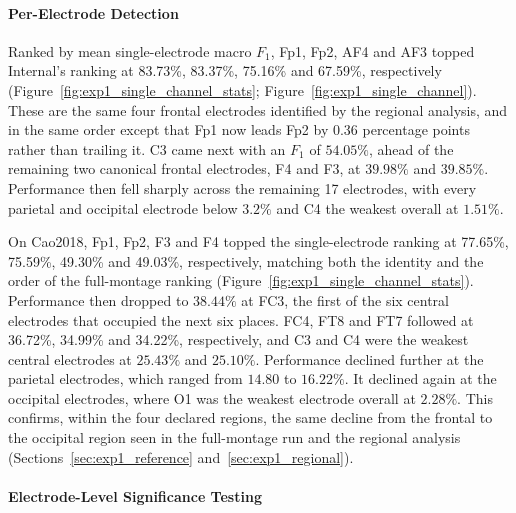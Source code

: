 \documentclass[journal,twoside,web]{ieeecolor}
\begin{document}
\paragraph{Per-Electrode Detection}
\label{sec:exp1_single_channel_per_electrode}

%
Ranked by mean single-electrode macro $F_1$, Fp1, Fp2, AF4 and AF3 topped Internal's ranking at 83.73\%, 83.37\%, 75.16\% and 67.59\%, respectively (Figure~\ref{fig:exp1_single_channel_stats}; Figure~\ref{fig:exp1_single_channel}). These are the same four frontal electrodes identified by the regional analysis, and in the same order except that Fp1 now leads Fp2 by 0.36 percentage points rather than trailing it. C3 came next with an $F_1$ of $54.05\%$, ahead of the remaining two canonical frontal electrodes, F4 and F3, at $39.98\%$ and $39.85\%$. Performance then fell sharply across the remaining 17 electrodes, with every parietal and occipital electrode below $3.2\%$ and C4 the weakest overall at $1.51\%$.
 
%
On Cao2018, Fp1, Fp2, F3 and F4 topped the single-electrode ranking at 77.65\%, 75.59\%, 49.30\% and 49.03\%, respectively, matching both the identity and the order of the full-montage ranking (Figure~\ref{fig:exp1_single_channel_stats}). Performance then dropped to $38.44\%$ at FC3, the first of the six central electrodes that occupied the next six places. FC4, FT8 and FT7 followed at 36.72\%, 34.99\% and 34.22\%, respectively, and C3 and C4 were the weakest central electrodes at $25.43\%$ and $25.10\%$. Performance declined further at the parietal electrodes, which ranged from $14.80$ to $16.22\%$. It declined again at the occipital electrodes, where O1 was the weakest electrode overall at $2.28\%$. This confirms, within the four declared regions, the same decline from the frontal to the occipital region seen in the full-montage run and the regional analysis (Sections~\ref{sec:exp1_reference} and~\ref{sec:exp1_regional}).
 
%



\paragraph{Electrode-Level Significance Testing}
\label{sec:exp1_single_channel_electrode_level_stats}
\end{document}
